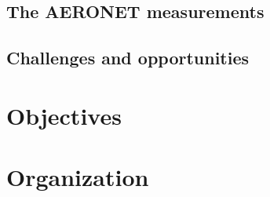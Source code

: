 \subsection{The AERONET measurements}

\subsection{Challenges and opportunities}

\section{Objectives}

\section{Organization}
